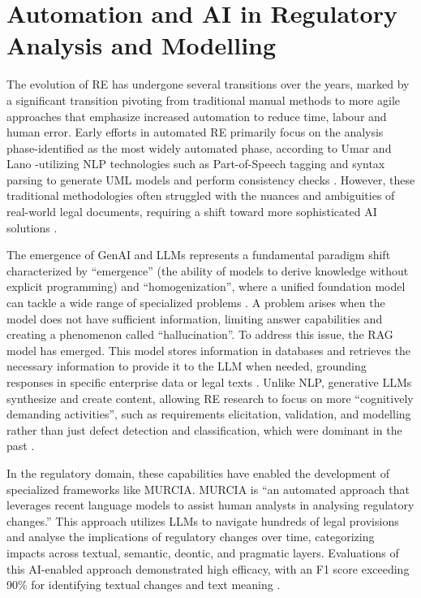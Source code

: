 \label{chap:base}

\section{Automation and \ac{AI} in Regulatory Analysis and Modelling}

The evolution of \ac{RE} has undergone several transitions over the years, marked by a significant transition pivoting from traditional manual methods to more agile approaches that emphasize increased automation to reduce time, labour and human error. Early efforts in automated \ac{RE} primarily focus on the analysis phase-identified as the most widely automated phase, according to Umar and Lano \cite{Umar2024}-utilizing \ac{NLP} technologies such as Part-of-Speech tagging and syntax parsing to generate \ac{UML} models and perform consistency checks \cite{Umar2024}. However, these traditional methodologies often struggled with the nuances and ambiguities of real-world legal documents, requiring a shift toward more sophisticated \ac{AI} solutions \cite{Zadenoori2025}. 

The emergence of \ac{GenAI} and \ac{LLM}s represents a fundamental paradigm shift characterized by ``emergence'' (the ability of models to derive knowledge without explicit programming) and ``homogenization'', where a unified foundation model can tackle a wide range of specialized problems \cite{Jeong2023}. A problem arises when the model does not have sufficient information, limiting answer capabilities and creating a phenomenon called ``hallucination''. To address this issue, the \ac{RAG} model has emerged. This model stores information in databases and retrieves the necessary information to provide it to the \ac{LLM} when needed, grounding responses in specific enterprise data or legal texts \cite{Jeong2023}. Unlike \ac{NLP}, generative \ac{LLM}s synthesize and create content, allowing \ac{RE} research to focus on more ``cognitively demanding activities'', such as requirements elicitation, validation, and modelling rather than just defect detection and classification, which were dominant in the past \cite{Zadenoori2025}.

In the regulatory domain, these capabilities have enabled the development of specialized frameworks like \ac{MURCIA}. \ac{MURCIA} is ``an automated approach that leverages recent language models to assist human analysts in analysing regulatory changes.'' This approach utilizes \ac{LLM}s to navigate hundreds of legal provisions and analyse the implications of regulatory changes over time, categorizing impacts across textual, semantic, deontic, and pragmatic layers. Evaluations of this \ac{AI}-enabled approach demonstrated high efficacy, with an F1 score exceeding 90\% for identifying textual changes and text meaning \cite{Abualhaija2024}.

